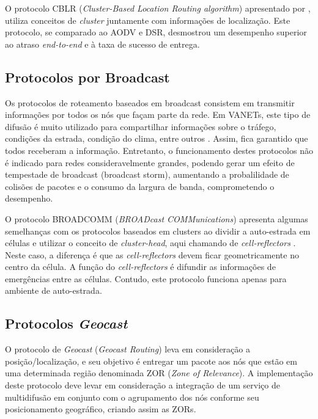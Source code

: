 \documentclass[
	12pt,				%
	oneside,			%
	a4paper,			%
	english,			%
	brazil				%
	]{abntex2ppgsi}
\begin{document}
O protocolo CBLR (\textit{Cluster-Based Location Routing algorithm}) apresentado por  , utiliza conceitos de \textit{cluster} juntamente com informações de localização. Este protocolo, se comparado ao AODV e DSR, desmostrou um desempenho superior ao atraso \textit{end-to-end} e à taxa de sucesso de entrega.


\subsection{Protocolos  por Broadcast}

Os protocolos de roteamento baseados em broadcast consistem em transmitir informações por todos os nós que façam parte da rede. Em VANETs, este tipo de difusão é muito utilizado para compartilhar informações sobre o tráfego, condições da estrada, condição do clima, entre outros \cite{luis2009melhoria}. Assim,  fica garantido que todos receberam a informação. Entretanto, o funcionamento destes protocolos não é indicado para redes consideravelmente grandes, podendo gerar um efeito de tempestade de broadcast (broadcast storm), aumentando a probalilidade de colisões de pacotes e o consumo da largura de banda, comprometendo o desempenho.

O protocolo BROADCOMM (\textit{BROADcast COMMunications}) apresenta algumas semelhanças com os protocolos baseados em clusters ao dividir a auto-estrada em células e utilizar o conceito de \textit{cluster-head}, aqui chamando de \textit{cell-reflectors} \cite{durresi2005emergency}. Neste caso, a diferença é que as \textit{cell-reflectors} devem ficar geometricamente no centro da célula. A função do \textit{cell-reflectors} é difundir as informações de emergências entre as células. Contudo, este protocolo funciona apenas para ambiente de auto-estrada.  

\subsection{Protocolos \textit{Geocast}}

O protocolo de \textit{Geocast} (\textit{Geocast Routing}) leva em consideração a posição/localização, e seu objetivo é entregar um pacote aos nós que estão em uma determinada região denominada ZOR (\textit{Zone of Relevance}). A implementação deste protocolo deve levar em consideração a integração de um serviço de multidifusão em conjunto com o agrupamento dos nós conforme seu posicionamento geográfico, criando assim as ZORs.
\end{document}
